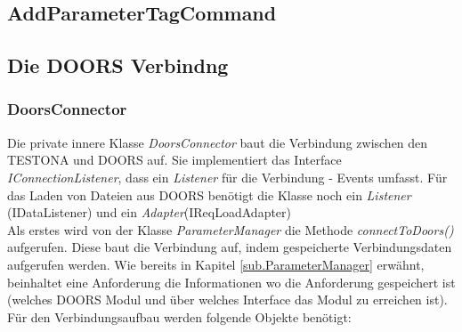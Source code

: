 \subsection{AddParameterTagCommand}\label{sub.Command}



\subsection{Die DOORS Verbindng}\label{sub.DoorsConn}
\subsubsection{DoorsConnector}

Die private innere Klasse \textit{DoorsConnector} baut die Verbindung zwischen den TESTONA und DOORS auf. Sie implementiert das Interface \textit{IConnectionListener}, dass ein \textit{Listener} für die Verbindung - Events umfasst. Für das Laden von Dateien aus DOORS benötigt die Klasse noch ein \textit{Listener} (IDataListener) und ein \textit{Adapter}(IReqLoadAdapter) \\

Als erstes wird von der Klasse \textit{ParameterManager} die Methode \textit{connectToDoors()} aufgerufen. Diese baut die Verbindung auf, indem gespeicherte Verbindungsdaten aufgerufen werden. Wie bereits in Kapitel \ref{sub.ParameterManager} erwähnt, beinhaltet eine Anforderung die Informationen wo die Anforderung gespeichert ist (welches DOORS Modul und über welches Interface das Modul zu erreichen ist). Für den Verbindungsaufbau werden folgende Objekte benötigt:

